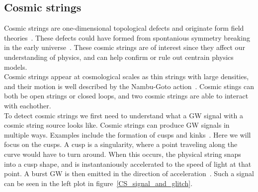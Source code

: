 \documentclass{article}
\newcommand\C[1]\null
\begin{document}
\begin{multicols}{2}
\subsection{Cosmic strings}
Cosmic strings are one-dimensional topological defects and originate form field theories~\cite{Meijer_2024}.
These defects could have formed from spontanious symmetry breaking in the early universe~\cite{schmitz2024gravitationalwavescosmicstrings}.
These cosmic strings are of interest since they affect our understanding of physics, and can help confirm or rule out centrain physics models. \\
\indent
Cosmic strings appear at cosmological scales as thin strings with large densities, and their motion is well described by the Nambu-Goto action~\cite{MairiSakellariadou}.
Cosmic stings can both be open strings or closed loops, and two cosmic strings are able to interact with eachother. \C{Needs citation}\\
\indent
To detect cosmic strings we first need to understand what a GW signal with a cosmic string source looks like.
Cosmic strings can produce GW signals in multiple ways. Examples include the formation of cusps and kinks~\cite{PhysRevLett126241102}. 
Here we will focus on the cusps. A cusp is a singularity, where a point traveling along the curve would have to turn around.
When this occurs, the physical string snaps into a cusp shape, and is instantaniously accelerated to the speed of light at that point.
A burst GW is then emitted in the direction of acceleration~\cite{Meijer_2024}.
Such a signal can be seen in the left plot in figure~\ref{CS_signal_and_glitch}.\\
\begin{figure}[H]
    \centering
    \begin{subfigure}[b]{0.49\columnwidth}

\end{subfigure}
\end{figure}
\end{multicols}
\end{document}

